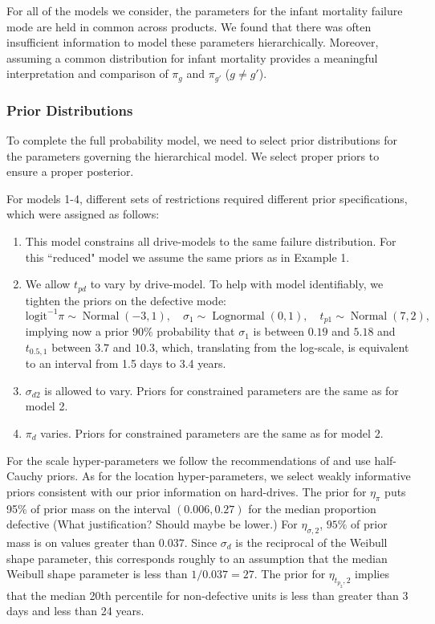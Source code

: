 \documentclass[12pt]{article}
\newcommand{\op}{\operatorname}
\begin{document}
For all of the models we consider, the parameters for the infant mortality failure mode are held in common across products.  We found that there was often insufficient information to model these parameters hierarchically.  Moreover, assuming a common distribution for infant mortality provides a meaningful interpretation and comparison of $\pi_g$ and $\pi_{g'}$ ($g \neq g'$). 

\subsubsection{Prior Distributions}
\label{sec:Prior Distributions}
To complete the full probability model, we need to select prior distributions for the parameters governing the hierarchical model. We select proper priors to ensure a proper posterior.

For models 1-4, different sets of restrictions required different prior specifications, which were assigned as follows:

\begin{enumerate}
\item This model constrains all drive-models to the same failure distribution. For this ``reduced" model we assume the same priors as in Example 1.

\item We allow $t_{pd}$ to vary by drive-model. To help with model identifiably, we tighten the priors on the defective mode:
$$ \mbox{logit}^{-1}\pi \sim \op{Normal}(-3,1),\quad \sigma_1 \sim \op{Lognormal}(0, 1), \quad t_{p1} \sim \op{Normal}(7,2),$$
implying now a prior $90\%$ probability that $\sigma_1$ is between $0.19$ and $5.18$ and $t_{0.5,1}$ between $3.7$ and $10.3$, which, translating from the log-scale, is equivalent to an interval from 1.5 days to 3.4 years.

\item $\sigma_{d2}$ is allowed to vary. Priors for constrained parameters are the same as for model 2.

\item $\pi_d$ varies. Priors for constrained parameters are the same as for model 2.

\end{enumerate}

For the scale hyper-parameters we follow the recommendations of \citet{gelman2014bayesian} and use half-Cauchy priors. As for the location hyper-parameters, we select weakly informative priors consistent with our prior information on hard-drives. The prior for $\eta_\pi$ puts 95\% of prior mass on the interval $(0.006, 0.27)$ for the median proportion defective (What justification? Should maybe be lower.) For $\eta_{\sigma, 2}$, $95\%$ of prior mass is on values greater than $0.037$. Since $\sigma_d$ is the reciprocal of the Weibull shape parameter, this corresponds roughly to an assumption that the median Weibull shape parameter is less than $1/0.037 = 27$. The prior for $\eta_{t_{p_2},2}$ implies that the median 20th percentile for non-defective units is less than greater than 3 days and less than 24 years.
\end{document}
